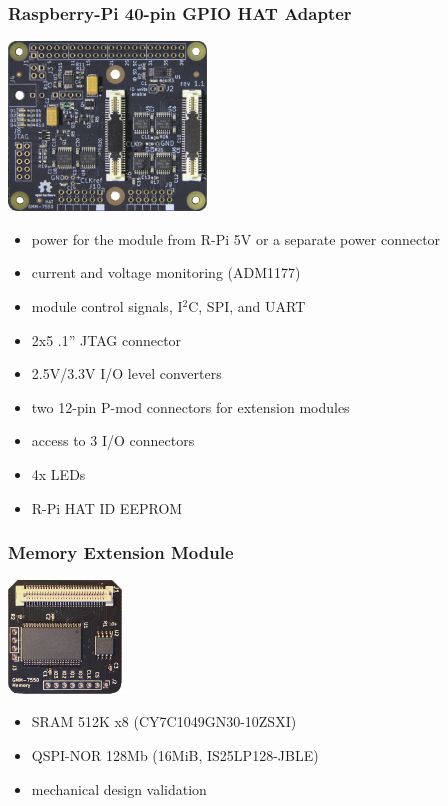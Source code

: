 \begin{frame}
  \frametitle{Raspberry-Pi 40-pin GPIO HAT Adapter}
  \begin{flushright}
    \includegraphics[angle=90, height=4.5cm]{hat-gmm7550.jpg}
  \end{flushright}
  \vspace{-5cm}

  \begin{minipage}{9cm}
  \begin{itemize}
  \item power for the module from R-Pi 5V or a separate power connector
  \item current and voltage monitoring (ADM1177)
  \item module control signals, I$^2$C, SPI, and UART
  \item 2x5 .1'' JTAG connector
  \item 2.5V/3.3V I/O level converters
  \item two 12-pin P-mod connectors for extension modules
  \item access to 3 I/O connectors
  \item 4x LEDs
  \item R-Pi HAT ID EEPROM
  \end{itemize}
  \end{minipage}
\end{frame}

\begin{frame}
  \frametitle{Memory Extension Module}
  \begin{flushright}
    \includegraphics[height=3cm]{mem-module.jpg}
  \end{flushright}
  \vspace{-3cm}

  \begin{minipage}{9cm}
  \begin{itemize}
  \item SRAM 512K x8 (CY7C1049GN30-10ZSXI)
  \item QSPI-NOR 128Mb (16MiB, IS25LP128-JBLE)
  \vspace{.5cm}
  \item mechanical design validation
  \end{itemize}
  \end{minipage}
\end{frame}

